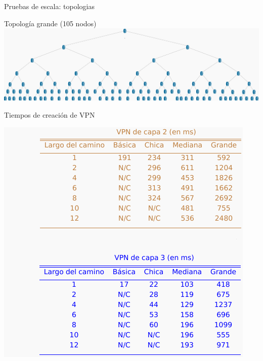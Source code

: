 \documentclass[xcolor=svgnames]{beamer}
\begin{document}
\begin{frame}{Pruebas de escala: topologias}
	\begin{center}
		Topología grande (105 nodos)
		\includegraphics[scale=0.09]{large_topology}
	\end{center}
\end{frame}

\begin{frame}{Tiempos de creación de VPN}
	\begin{center}
		\includegraphics[height=0.9\textheight]{tiempos_vpn}
	\end{center}
\end{frame}
\end{document}
